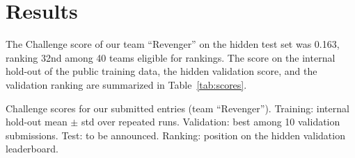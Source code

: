 \section{Results}
\label{sec:results}


The Challenge score of our team ``Revenger'' on the hidden test set was 0.163, ranking 32nd among 40 teams eligible for rankings. The score on the internal hold-out of the public training data, the hidden validation score, and the validation ranking are summarized in Table~\ref{tab:scores}.

\begin{table}[!htp]
\centering

\caption{Challenge scores for our submitted entries (team ``Revenger''). Training: internal hold-out mean $\pm$ std over repeated runs. Validation: best among 10 validation submissions. Test: to be announced. Ranking: position on the hidden validation leaderboard.}
\label{tab:scores}
\end{table}
